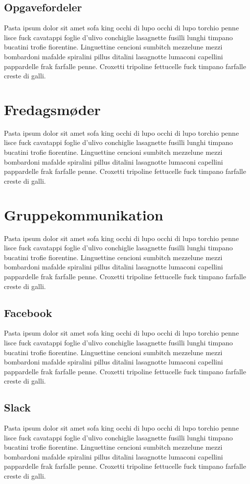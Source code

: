 \subsection{Opgavefordeler}
Pasta ipsum dolor sit amet sofa king occhi di lupo occhi di lupo torchio penne lisce fuck cavatappi foglie d'ulivo conchiglie lasagnette fusilli lunghi timpano bucatini trofie fiorentine. Linguettine cencioni sumbitch mezzelune mezzi bombardoni mafalde spiralini pillus ditalini lasagnotte lumaconi capellini pappardelle frak farfalle penne. Croxetti tripoline fettucelle fuck timpano farfalle creste di galli.

\section{Fredagsmøder}
Pasta ipsum dolor sit amet sofa king occhi di lupo occhi di lupo torchio penne lisce fuck cavatappi foglie d'ulivo conchiglie lasagnette fusilli lunghi timpano bucatini trofie fiorentine. Linguettine cencioni sumbitch mezzelune mezzi bombardoni mafalde spiralini pillus ditalini lasagnotte lumaconi capellini pappardelle frak farfalle penne. Croxetti tripoline fettucelle fuck timpano farfalle creste di galli.

\section{Gruppekommunikation}
Pasta ipsum dolor sit amet sofa king occhi di lupo occhi di lupo torchio penne lisce fuck cavatappi foglie d'ulivo conchiglie lasagnette fusilli lunghi timpano bucatini trofie fiorentine. Linguettine cencioni sumbitch mezzelune mezzi bombardoni mafalde spiralini pillus ditalini lasagnotte lumaconi capellini pappardelle frak farfalle penne. Croxetti tripoline fettucelle fuck timpano farfalle creste di galli.

\subsection{Facebook}
Pasta ipsum dolor sit amet sofa king occhi di lupo occhi di lupo torchio penne lisce fuck cavatappi foglie d'ulivo conchiglie lasagnette fusilli lunghi timpano bucatini trofie fiorentine. Linguettine cencioni sumbitch mezzelune mezzi bombardoni mafalde spiralini pillus ditalini lasagnotte lumaconi capellini pappardelle frak farfalle penne. Croxetti tripoline fettucelle fuck timpano farfalle creste di galli.

\subsection{Slack}
Pasta ipsum dolor sit amet sofa king occhi di lupo occhi di lupo torchio penne lisce fuck cavatappi foglie d'ulivo conchiglie lasagnette fusilli lunghi timpano bucatini trofie fiorentine. Linguettine cencioni sumbitch mezzelune mezzi bombardoni mafalde spiralini pillus ditalini lasagnotte lumaconi capellini pappardelle frak farfalle penne. Croxetti tripoline fettucelle fuck timpano farfalle creste di galli.

